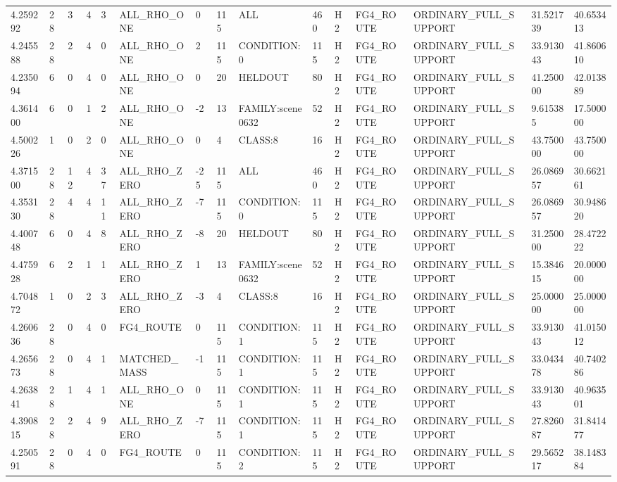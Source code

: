 \begin{tabular}{lllllllllllllll}
4.259292 & 28 & 3 & 4 & 3 & ALL\_RHO\_ONE & 0 & 115 & ALL & 460 & H2 & FG4\_ROUTE & ORDINARY\_FULL\_SUPPORT & 31.521739 & 40.653413 \\
4.245588 & 28 & 2 & 4 & 0 & ALL\_RHO\_ONE & 2 & 115 & CONDITION:0 & 115 & H2 & FG4\_ROUTE & ORDINARY\_FULL\_SUPPORT & 33.913043 & 41.860610 \\
4.235094 & 6 & 0 & 4 & 0 & ALL\_RHO\_ONE & 0 & 20 & HELDOUT & 80 & H2 & FG4\_ROUTE & ORDINARY\_FULL\_SUPPORT & 41.250000 & 42.013889 \\
4.361400 & 6 & 0 & 1 & 2 & ALL\_RHO\_ONE & -2 & 13 & FAMILY:scene0632 & 52 & H2 & FG4\_ROUTE & ORDINARY\_FULL\_SUPPORT & 9.615385 & 17.500000 \\
4.500226 & 1 & 0 & 2 & 0 & ALL\_RHO\_ONE & 0 & 4 & CLASS:8 & 16 & H2 & FG4\_ROUTE & ORDINARY\_FULL\_SUPPORT & 43.750000 & 43.750000 \\
4.371500 & 28 & 12 & 4 & 37 & ALL\_RHO\_ZERO & -25 & 115 & ALL & 460 & H2 & FG4\_ROUTE & ORDINARY\_FULL\_SUPPORT & 26.086957 & 30.662161 \\
4.353130 & 28 & 4 & 4 & 11 & ALL\_RHO\_ZERO & -7 & 115 & CONDITION:0 & 115 & H2 & FG4\_ROUTE & ORDINARY\_FULL\_SUPPORT & 26.086957 & 30.948620 \\
4.400748 & 6 & 0 & 4 & 8 & ALL\_RHO\_ZERO & -8 & 20 & HELDOUT & 80 & H2 & FG4\_ROUTE & ORDINARY\_FULL\_SUPPORT & 31.250000 & 28.472222 \\
4.475928 & 6 & 2 & 1 & 1 & ALL\_RHO\_ZERO & 1 & 13 & FAMILY:scene0632 & 52 & H2 & FG4\_ROUTE & ORDINARY\_FULL\_SUPPORT & 15.384615 & 20.000000 \\
4.704872 & 1 & 0 & 2 & 3 & ALL\_RHO\_ZERO & -3 & 4 & CLASS:8 & 16 & H2 & FG4\_ROUTE & ORDINARY\_FULL\_SUPPORT & 25.000000 & 25.000000 \\
4.260636 & 28 & 0 & 4 & 0 & FG4\_ROUTE & 0 & 115 & CONDITION:1 & 115 & H2 & FG4\_ROUTE & ORDINARY\_FULL\_SUPPORT & 33.913043 & 41.015012 \\
4.265673 & 28 & 0 & 4 & 1 & MATCHED\_MASS & -1 & 115 & CONDITION:1 & 115 & H2 & FG4\_ROUTE & ORDINARY\_FULL\_SUPPORT & 33.043478 & 40.740286 \\
4.263841 & 28 & 1 & 4 & 1 & ALL\_RHO\_ONE & 0 & 115 & CONDITION:1 & 115 & H2 & FG4\_ROUTE & ORDINARY\_FULL\_SUPPORT & 33.913043 & 40.963501 \\
4.390815 & 28 & 2 & 4 & 9 & ALL\_RHO\_ZERO & -7 & 115 & CONDITION:1 & 115 & H2 & FG4\_ROUTE & ORDINARY\_FULL\_SUPPORT & 27.826087 & 31.841477 \\
4.250591 & 28 & 0 & 4 & 0 & FG4\_ROUTE & 0 & 115 & CONDITION:2 & 115 & H2 & FG4\_ROUTE & ORDINARY\_FULL\_SUPPORT & 29.565217 & 38.148384 \\

\end{tabular}
